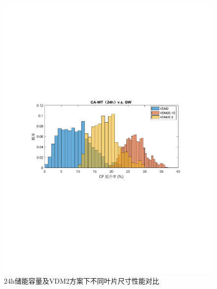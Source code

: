 \begin{figure}[H] %
  \centering
  \includegraphics[scale=0.75]{figures/Chap5-CA-WT-24h-VS-GW-VDM2E.pdf}
  \caption{24h储能容量及VDM2方案下不同叶片尺寸性能对比}
  \label{fig:CA-WT-24h-VS-GW-VDM2E}
\end{figure}

